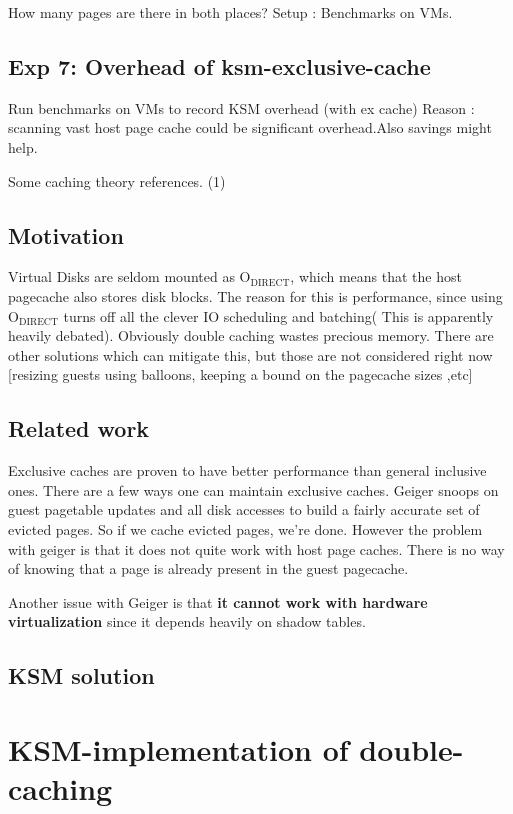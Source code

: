 \documentclass[11pt]{article}
\begin{document}
How many pages are there in both places?
Setup : Benchmarks on VMs.
\subsection{Exp 7: Overhead of ksm-exclusive-cache}
\label{sec-8_4}

Run benchmarks on VMs to record KSM overhead (with ex cache)
Reason : scanning vast host page cache could be significant overhead.Also savings might help.

Some caching theory references.
(1)
\subsection{Motivation}
\label{sec-8_5}

 Virtual Disks are seldom mounted as O$_{\mathrm{DIRECT}}$, which means that the  host pagecache also stores disk blocks. The reason for this is performance,  since using O$_{\mathrm{DIRECT}}$ turns off all the clever IO scheduling and batching( This is apparently heavily debated).
Obviously double caching wastes precious memory. There are other solutions which can mitigate this, but those are not considered right now [resizing guests using balloons, keeping a bound on the pagecache sizes ,etc]
\subsection{Related work}
\label{sec-8_6}

Exclusive caches are proven to have better performance than  general inclusive ones. There are a few ways one can maintain exclusive caches. 
Geiger snoops on guest pagetable updates  and all disk accesses to build a  fairly accurate set of evicted pages. So if we cache evicted pages, we're done. However the problem with geiger is that it does not quite work with host page caches. There is no way of knowing that a page is already present in the guest pagecache. 

Another issue with Geiger is that \textbf{it cannot work with hardware virtualization} since it depends heavily on shadow tables. 
\subsection{KSM solution}
\label{sec-8_7}

    
\section{KSM-implementation of double-caching}
\label{sec-9}
\end{document}

